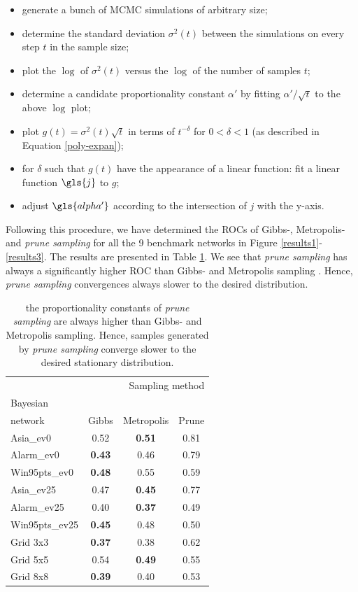 \documentclass[a4paper, twoside, 11pt]{report}
\theoremstyle{plain}
\theoremstyle{definition}
\theoremstyle{remark}
\newcommand{\ps}{\textit{prune sampling }}
\begin{document}
\begin{itemize}
\item generate a bunch of MCMC simulations of arbitrary size;
\item determine the standard deviation ${\sigma}^2(t)$ between the simulations on every step $t$ in the sample size;
\item plot the $\log$ of ${\sigma}^2(t)$ versus the $\log$ of the number of samples $t$;
\item determine a candidate proportionality constant $\alpha'$ by fitting $\alpha' / \sqrt{t}$ to the above $\log$ plot;
\item plot $g(t) = {\sigma}^2(t) \sqrt{t}$ in terms of $t^{-\delta}$ for $0 < \delta < 1$ (as described in Equation \ref{poly-expan});
\item for $\delta$ such that $g(t)$ have the appearance of a linear function: fit a linear function $\gls{j}$ to $g$;
\item adjust $\gls{alpha'}$ according to the intersection of $j$ with the y-axis.
\end{itemize}
Following this procedure, we have determined the ROCs of Gibbs-, Metropolis- and \ps for all the 9 benchmark networks in Figure \ref{results1}-\ref{results3}. The results are presented in Table \ref{ROC-table}. We see that \ps has always a significantly higher ROC than Gibbs- and Metropolis sampling . Hence, \ps convergences always slower to the desired distribution.
\begin{center}
\begin{table}[H]
\begin{center}
\begin{tabular}{l c c c}  
\toprule
\multicolumn{4}{r}{Sampling method} \\
\cmidrule(r){2-4}
Bayesian \\ network    & Gibbs    & Metropolis & Prune  \\
\midrule
Asia\_ev0 & 0.52 & \textbf{0.51} & 0.81  \\
Alarm\_ev0 & \textbf{0.43} & 0.46 & 0.79  \\
Win95pts\_ev0 & \textbf{0.48} & 0.55 & 0.59  \\
Asia\_ev25 & 0.47 & \textbf{0.45} & 0.77  \\
Alarm\_ev25 & 0.40 & \textbf{0.37} & 0.49  \\
Win95pts\_ev25 & \textbf{0.45} & 0.48 & 0.50  \\
Grid 3x3 & \textbf{0.37} & 0.38 & 0.62  \\
Grid 5x5 & 0.54 & \textbf{0.49} & 0.55  \\
Grid 8x8 & \textbf{0.39} & 0.40 & 0.53  \\
\bottomrule
\end{tabular}
\caption{the proportionality constants of \ps are always higher than Gibbs- and Metropolis sampling. Hence, samples generated by \ps converge slower to the desired stationary distribution.}
\label{ROC-table}
\end{center}
\end{table}
\end{center}
\end{document}
